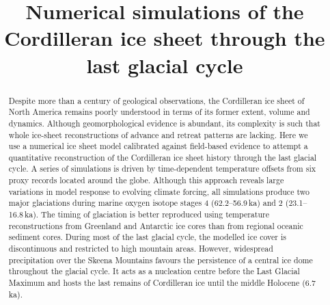 \documentclass[tc, manuscript]{copernicus}
\begin{document}
\hack{\sloppy}


\title{Numerical simulations of the Cordilleran ice sheet
       through the last glacial cycle}







\hack{\allowdisplaybreaks}

\published{}


\maketitle


\begin{abstract}
Despite more than a century of geological observations, the
Cordilleran ice sheet of North America remains poorly understood in
terms of its former extent, volume and dynamics. Although
geomorphological evidence is abundant, its complexity is such that
whole ice-sheet reconstructions of advance and retreat patterns are
lacking. Here we use a numerical ice sheet model calibrated against
field-based evidence to attempt a quantitative reconstruction of the
Cordilleran ice sheet history through the last glacial
cycle. A series of simulations is driven by time-dependent
temperature offsets from six proxy records located around the
globe. Although this approach reveals large variations in model
response to evolving climate forcing, all simulations produce two
major glaciations during marine oxygen isotope stages 4
(62.2--56.9\,\unit{ka}) and 2 (23.1--16.8\,\unit{ka}). The timing of
glaciation is better reproduced using temperature reconstructions
from Greenland and Antarctic ice cores than from regional oceanic
sediment cores. During most of the last glacial cycle, the modelled
ice cover is discontinuous and restricted to high mountain
areas. However, widespread precipitation over the Skeena Mountains
favours the persistence of a central ice dome throughout the glacial
cycle. It acts as a nucleation centre before the Last Glacial
Maximum and hosts the last remains of Cordilleran ice until the
middle Holocene (6.7\,\unit{ka}).
\end{abstract}
\end{document}
